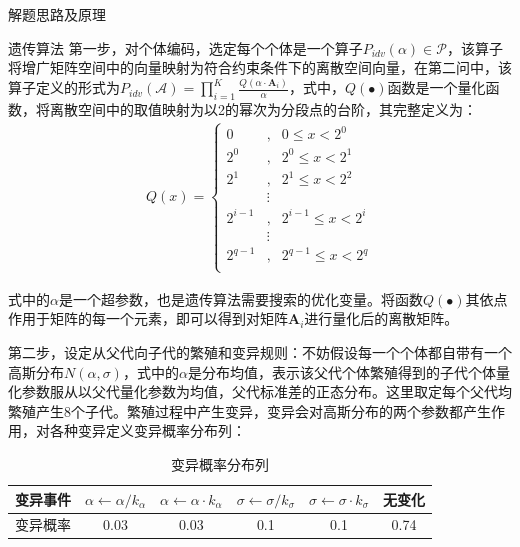 \documentclass[11pt]{article}
\begin{document}
\begin{section}{解题思路及原理}
\begin{subsection}{遗传算法}
   第一步，对个体编码，选定每个个体是一个算子$P_{idv}(\alpha)\in\mathcal{P}$，该算子将增广矩阵空间中的向量映射为符合约束条件下的离散空间向量，在第二问中，该算子定义的形式为$\displaystyle P_{idv}(\mathcal{A})=\prod_{i=1}^K \frac{Q(\alpha\cdot\mathbf{A}_i)}{\alpha}$，式中，$Q(\bullet)$函数是一个量化函数，将离散空间中的取值映射为以2的幂次为分段点的台阶，其完整定义为：
   \begin{align}
     Q(x)=\left\{
     \begin{aligned}
       0       & ,      & 0\le x< 2^0       \\
       2^0     & ,      & 2^0\le x< 2^1     \\
       2^1     & ,      & 2^1\le x< 2^2     \\
               & \vdots &                   \\
       2^{i-1} & ,      & 2^{i-1}\le x< 2^i \\
               & \vdots &                   \\
       2^{q-1} & ,      & 2^{q-1}\le x< 2^q \\
     \end{aligned}
     \right.\label{eq:离散量化函数}
   \end{align}\par
   式中的$\alpha$是一个超参数，也是遗传算法需要搜索的优化变量。将函数$Q(\bullet)$其依点作用于矩阵的每一个元素，即可以得到对矩阵$\mathbf{A}_i$进行量化后的离散矩阵。\par
   第二步，设定从父代向子代的繁殖和变异规则：不妨假设每一个个体都自带有一个高斯分布$N(\alpha,\sigma)$，式中的$\alpha$是分布均值，表示该父代个体繁殖得到的子代个体量化参数服从以父代量化参数为均值，父代标准差的正态分布。这里取定每个父代均繁殖产生8个子代。繁殖过程中产生变异，变异会对高斯分布的两个参数都产生作用，对各种变异定义变异概率分布列：
   \begin{table}[H]
     \caption{变异概率分布列}
     \centering
     \begin{tabular}{c|c|c|c|c|c}
       \hline
       变异事件 & $\alpha\leftarrow\alpha/k_\alpha$ & $\alpha\leftarrow\alpha\cdot k_\alpha$ & $\sigma\leftarrow\sigma/ k_\sigma$ & $\sigma\leftarrow\sigma\cdot k_\sigma$ & 无变化  \\
       \hline
       变异概率 & 0.03                              & 0.03                                   & 0.1                                & 0.1                                    & 0.74 \\
       \hline
     \end{tabular}
     \label{table:变异概率分布列}

\end{table}
\end{subsection}
\end{section}
\end{document}
